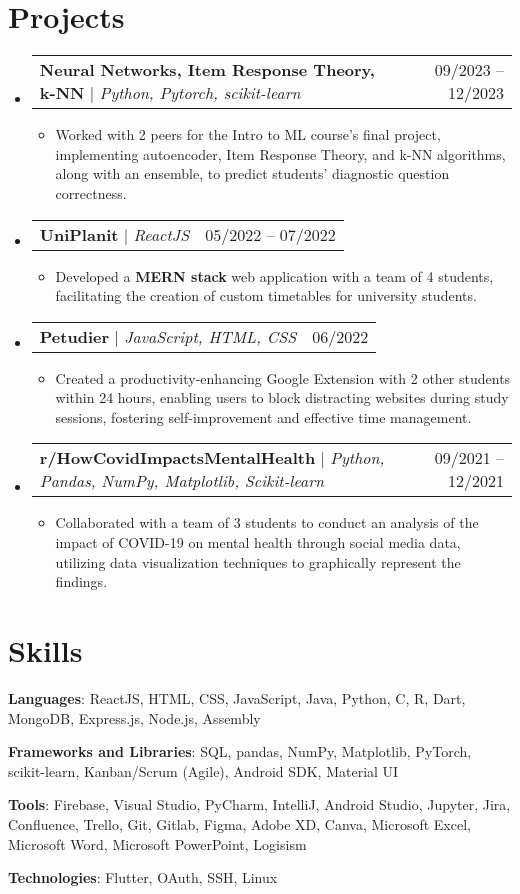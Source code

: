 \documentclass[letterpaper,11pt]{article}
\makeatletter
\newcommand{\resumeItem}[1]{
  \item\small{
    {#1 \vspace{-2pt}}
  }
}
\newcommand{\resumeProjectHeading}[2]{
    \item
    \begin{tabular*}{0.97\textwidth}{l@{\extracolsep{\fill}}r}
      \small#1 & #2 \\
    \end{tabular*}\vspace{-7pt}
}
\newcommand{\resumeSubHeadingListStart}{\begin{itemize}[leftmargin=0.15in, label={}]}
\newcommand{\resumeSubHeadingListEnd}{\end{itemize}}
\newcommand{\resumeItemListStart}{\begin{itemize}}
\newcommand{\resumeItemListEnd}{\end{itemize}\vspace{-5pt}}
\makeatother
\begin{document}
\section{Projects}
    \resumeSubHeadingListStart
        \resumeProjectHeading
          {\textbf{Neural Networks, Item Response Theory, k-NN} $|$ \emph{Python, Pytorch, scikit-learn}}{09/2023 -- 12/2023}
          \resumeItemListStart
            \resumeItem{Worked with 2 peers for the Intro to ML course's final project, implementing autoencoder, Item Response Theory, and k-NN algorithms, along with an ensemble, to predict students’ diagnostic question correctness.}
          \resumeItemListEnd
      \resumeProjectHeading
          {\textbf{UniPlanit} $|$ \emph{ReactJS}}{05/2022 -- 07/2022}
          \resumeItemListStart
            \resumeItem{Developed a \textbf{MERN stack} web application with a team of 4 students, facilitating the creation of custom timetables for university students.}
          \resumeItemListEnd
      \resumeProjectHeading
          {\textbf{Petudier} $|$ \emph{JavaScript, HTML, CSS}}{06/2022}
          \resumeItemListStart
            \resumeItem{Created a productivity-enhancing Google Extension with 2 other students within 24 hours, enabling users to block distracting websites during study sessions, fostering self-improvement and effective time management.}
          \resumeItemListEnd
        \resumeProjectHeading   {\textbf{r/HowCovidImpactsMentalHealth} $|$ \emph{Python, Pandas, NumPy, Matplotlib, Scikit-learn}}{09/2021 -- 12/2021}
          \resumeItemListStart
            \resumeItem{Collaborated with a team of 3 students to conduct an analysis of the impact of COVID-19 on mental health through social media data, utilizing data visualization techniques to graphically represent the findings.}
          \resumeItemListEnd
    \resumeSubHeadingListEnd



%
\section{Skills}
 \begin{itemize}[leftmargin=0.15in, label={}]
    \small{
    \item{
     \textbf{Languages}{: ReactJS, HTML, CSS, JavaScript, Java, Python, C, R, Dart, MongoDB, Express.js, Node.js, Assembly} \\
    }
    \item{
     \textbf{Frameworks and Libraries}{: SQL, pandas, NumPy, Matplotlib, PyTorch, scikit-learn, Kanban/Scrum (Agile), Android SDK, Material UI} \\
    }
    \item{
     \textbf{Tools}{: Firebase, Visual Studio, PyCharm, IntelliJ, Android Studio, Jupyter, Jira, Confluence, Trello, Git, Gitlab, Figma, Adobe XD, Canva, Microsoft Excel, Microsoft Word, Microsoft PowerPoint, Logisism} \\
    }
    \item{
     \textbf{Technologies}{: Flutter, OAuth, SSH, Linux} \\
    }
    
    }
 \end{itemize}


\end{document}
